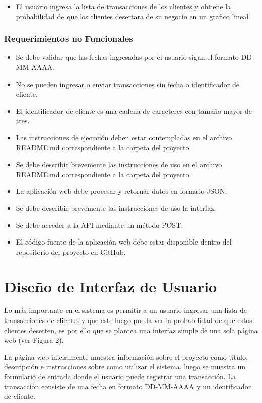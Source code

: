 \begin{itemize}
	\item El usuario ingresa la lista de transacciones de los clientes y obtiene la probabilidad de que los clientes desertara de su negocio en un grafico lineal.
\end{itemize}

\subsubsection{Requerimientos no Funcionales}

\begin{itemize}
	\item Se debe validar que las fechas ingresadas por el usuario sigan el formato DD-MM-AAAA.
	\item No se pueden ingresar o enviar transacciones sin fecha o identificador de cliente.
	\item El identificador de cliente es una cadena de caracteres con tamaño mayor de tres.
	\item Las instrucciones de ejecución deben estar contempladas en el archivo README.md correspondiente a la carpeta del proyecto.
	\item Se debe describir brevemente las instrucciones de uso en el archivo README.md correspondiente a la carpeta del proyecto.
	\item La aplicación web debe procesar y retornar datos en formato JSON.
	\item Se debe describir brevemente las instrucciones de uso la interfaz.
	\item Se debe acceder a la API mediante un método POST.
	\item El código fuente de la aplicación web debe estar disponible dentro del repositorio del proyecto en GitHub.
\end{itemize}

\section{Diseño de Interfaz de Usuario}

Lo más importante en el sistema es permitir a un usuario ingresar una lista de transacciones de clientes y que este luego pueda ver la probabilidad de que estos clientes deserten, es por ello que se plantea una interfaz simple de una sola página web (ver Figura 2).

La página web inicialmente muestra información sobre el proyecto como título, descripción e instrucciones sobre como utilizar el sistema, luego se muestra un formulario de entrada donde el usuario puede registrar una transacción. La transacción consiste de una fecha en formato DD-MM-AAAA y un identificador de cliente. 

